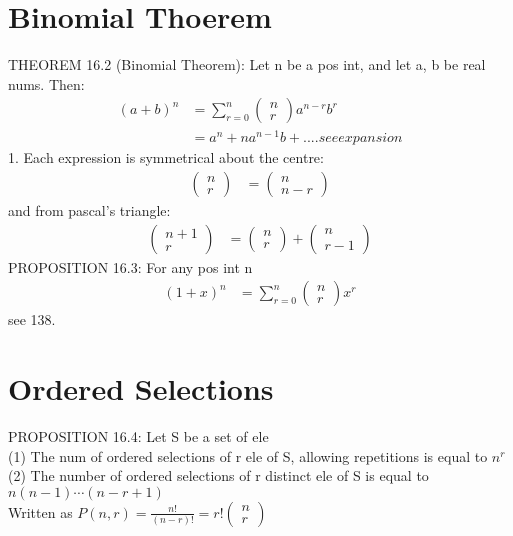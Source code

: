 \documentclass[12pt]{article}
\begin{document}
\section{Binomial Thoerem}
	THEOREM 16.2 (Binomial Theorem): Let n be a pos int, and let
	a, b be real nums. Then:
	\begin{align*}
		(a + b)^n &= \sum_{r=0}^n \begin{pmatrix} n \\ r \end{pmatrix}
		a^{n-r}b^r \\
		&= a^n + na^{n-1}b + .... see expansion
	\end{align*}
	1. Each expression is symmetrical about the centre:
	\begin{align*}
		\begin{pmatrix} n \\ r \end{pmatrix} &= 
		\begin{pmatrix} n \\ n-r \end{pmatrix}
	\end{align*}
	and from pascal's triangle:
	\begin{align*}
		\begin{pmatrix} n+1 \\ r \end{pmatrix} &= 
		\begin{pmatrix} n \\ r \end{pmatrix} +
		\begin{pmatrix} n \\ r-1 \end{pmatrix}
	\end{align*}
	PROPOSITION 16.3: For any pos int n
	\begin{align*}
		(1 + x)^n &= \sum_{r=0}^n \begin{pmatrix} n \\ r \end{pmatrix} x^r
	\end{align*}
	see 138.
\section{Ordered Selections}
	PROPOSITION 16.4: Let S be a set of ele \\
	(1) The num of ordered selections of r ele of S, allowing repetitions
	is equal to $ n^r $ \\
	(2) The number of ordered selections of r distinct ele of S is equal
	to $ n(n-1) \cdots (n-r+1) $ \\
	Written as $ P(n, r) = \frac{n!}{(n-r)!} = r! 	\begin{pmatrix} n \\ r \end{pmatrix} $ 
\end{document}
